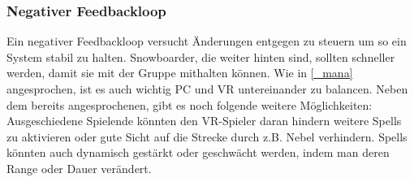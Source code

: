 \subsubsection{Negativer Feedbackloop\label{_rubberbanding}}
Ein negativer Feedbackloop versucht Änderungen entgegen zu steuern um so ein System stabil zu halten\cite[S.133]{_game_design_workshop}. Snowboarder, die weiter hinten sind, sollten schneller werden, damit sie mit der Gruppe mithalten können. Wie in \ref{_mana} angesprochen, ist es auch wichtig PC und VR untereinander zu balancen. Neben dem bereits angesprochenen, gibt es noch folgende weitere Möglichkeiten: Ausgeschiedene Spielende könnten den VR-Spieler daran hindern weitere Spells zu aktivieren oder gute Sicht auf die Strecke durch z.B. Nebel verhindern. Spells könnten auch dynamisch gestärkt oder geschwächt werden, indem man deren Range oder Dauer verändert.